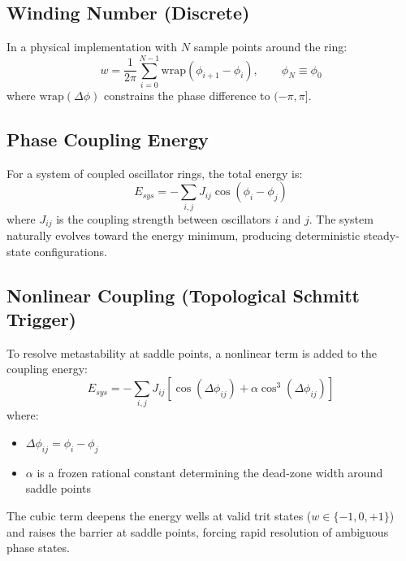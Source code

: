 \documentclass[11pt, a4paper]{article}
\begin{document}
\subsection{Winding Number (Discrete)}

In a physical implementation with $N$ sample points around the ring:
\begin{equation}
  w = \frac{1}{2\pi} \sum_{i=0}^{N-1} \text{wrap}(\phi_{i+1} - \phi_i),
  \qquad \phi_N \equiv \phi_0
  \label{eq:winding-discrete}
\end{equation}
where $\text{wrap}(\Delta\phi)$ constrains the phase difference to $(-\pi, \pi]$.

\subsection{Phase Coupling Energy}

For a system of coupled oscillator rings, the total energy is:
\begin{equation}
  E_{sys} = -\sum_{i,j} J_{ij} \cos(\phi_i - \phi_j)
  \label{eq:coupling-energy}
\end{equation}
where $J_{ij}$ is the coupling strength between oscillators $i$ and $j$.
The system naturally evolves toward the energy minimum, producing
deterministic steady-state configurations.

\subsection{Nonlinear Coupling (Topological Schmitt Trigger)}

To resolve metastability at saddle points, a nonlinear term is added to
the coupling energy:
\begin{equation}
  E_{sys} = -\sum_{i,j} J_{ij} \left[ \cos(\Delta\phi_{ij})
            + \alpha \cos^3(\Delta\phi_{ij}) \right]
  \label{eq:schmitt}
\end{equation}
where:
\begin{itemize}[nosep]
  \item $\Delta\phi_{ij} = \phi_i - \phi_j$
  \item $\alpha$ is a frozen rational constant determining the dead-zone width
        around saddle points
\end{itemize}

The cubic term deepens the energy wells at valid trit states ($w \in \{-1,0,+1\}$)
and raises the barrier at saddle points, forcing rapid resolution of ambiguous
phase states.
\end{document}
